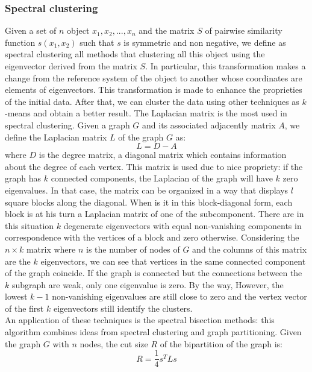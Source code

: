 \subsubsection{Spectral clustering}
Given a set of $n$ object $x_1 ,x_2, ..., x_n$ and the matrix $S$ of pairwise similarity function $s(x_1, x_2)$ such that $s$ is symmetric and non negative, we define as spectral clustering all methods that clustering all this object using the eigenvector derived from the matrix $S$.
In particular, this transformation makes a change from the reference system of the object to another whose coordinates are elements of eigenvectors. This transformation is made to enhance the proprieties of the initial data.  After that, we can cluster the data using other techniques as $k$-means and obtain a better result. The Laplacian matrix is the most used in spectral clustering. Given a graph $G$ and its associated adjacently matrix $A$, we define the Laplacian matrix $L$ of the graph $G$ as:
\begin{equation}
L = D - A 
\end{equation}
where $D$ is the degree matrix, a diagonal matrix which contains information about the degree of each vertex. This matrix is used due to nice propriety: if the graph has $k$ connected components, the Laplacian of the graph will have $k$ zero eigenvalues.
In that case, the matrix can be organized in a way that displays $l$ square blocks along
the diagonal. When is it in this block-diagonal form, each block is at his turn a Laplacian matrix of one of the subcomponent.
There are in this situation $k$ degenerate eigenvectors with equal non-vanishing components in correspondence with the vertices of a block and zero otherwise. 
Considering the $n\times k$ matrix where $n$ is the number of nodes of $G$ and the columns of this matrix are the $k$ eigenvectors, we can see that vertices in the same connected component of the graph coincide.
If the graph is connected but the connections between the $k$ subgraph are weak, only one eigenvalue is zero. By the way, However, the lowest $k - 1$ non-vanishing eigenvalues are still close to zero and the vertex vector of the first $k$ eigenvectors still identify the clusters.\\
An application of these techniques is the spectral bisection methods: this algorithm combines ideas from spectral clustering and graph partitioning. 
Given the graph $G$ with $n$ nodes, the cut size $R$ of the bipartition of the graph is:
\begin{equation}\label{spec_bi_pa}
R = \frac{1}{4} s^TLs
\end{equation} 
